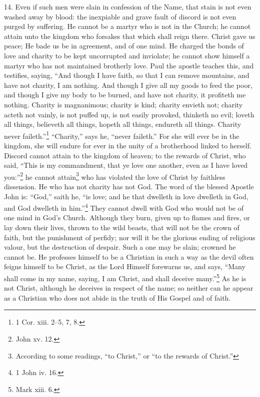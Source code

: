 14. Even if such men were slain in confession of the Name, that stain is not even washed away by blood: the inexpiable and grave fault of discord is not even purged by suffering. He cannot be a martyr who is not in the Church; he cannot attain unto the kingdom who forsakes that which shall reign there. Christ gave us peace; He bade us be in agreement, and of one mind. He charged the bonds of love and charity to be kept uncorrupted and inviolate; he cannot show himself a martyr who has not maintained brotherly love. Paul the apostle teaches this, and testifies, saying, “And though I have faith, so that I can remove mountains, and have not charity, I am nothing. And though I give all my goods to feed the poor, and though I give my body to be burned, and have not charity, it profiteth me nothing. Charity is magnanimous; charity is kind; charity envieth not; charity acteth not vainly, is not puffed up, is not easily provoked, thinketh no evil; loveth all things, believeth all things, hopeth all things, endureth all things. Charity never faileth.”\footnote{1 Cor. xiii. 2–5, 7, 8.} “Charity,” says he, “never faileth.” For she will ever be in the kingdom, she will endure for ever in the unity of a brotherhood linked to herself. Discord cannot attain to the kingdom of heaven; to the rewards of Christ, who said, “This is my commandment, that ye love one another, even as I have loved you:”\footnote{John xv. 12.} he cannot attain\footnote{According to some readings, “to Christ,” or “to the rewards of Christ.”} who has violated the love of Christ by faithless dissension. He who has not charity has not God. The word of the blessed Apostle John is: “God,” saith he, “is love; and he that dwelleth in love dwelleth in God, and God dwelleth in him.”\footnote{1 John iv. 16.} They cannot dwell with God who would not be of one mind in God’s Church. Although they burn, given up to flames and fires, or lay down their lives, thrown to the wild beasts, that will not be the crown of faith, but the punishment of perfidy; nor will it be the glorious ending of religious valour, but the destruction of despair. Such a one may be slain; crowned he cannot be. He professes himself to be a Christian in such a way as the devil often feigns himself to be Christ, as the Lord Himself forewarns us, and says, “Many shall come in my name, saying, I am Christ, and shall deceive many.”\footnote{Mark xiii. 6.} As he is not Christ, although he deceives in respect of the name; so neither can he appear as a Christian who does not abide in the truth of His Gospel and of faith.

